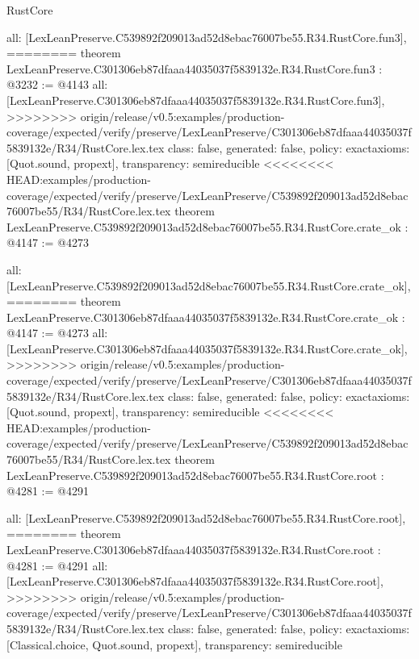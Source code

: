 \begin{lexlean}{RustCore}
\begin{coremodule}
{\begin{coremodule}
{{{{{{  all: [LexLeanPreserve.C539892f209013ad52d8ebac76007be55.R34.RustCore.fun3],
========
theorem LexLeanPreserve.C301306eb87dfaaa44035037f5839132e.R34.RustCore.fun3 : @3232 := @4143 {
  all: [LexLeanPreserve.C301306eb87dfaaa44035037f5839132e.R34.RustCore.fun3],
>>>>>>>> origin/release/v0.5:examples/production-coverage/expected/verify/preserve/LexLeanPreserve/C301306eb87dfaaa44035037f5839132e/R34/RustCore.lex.tex
  class: false,
  generated: false,
  policy: exact{axioms: [Quot.sound, propext]},
  transparency: semireducible
}
<<<<<<<< HEAD:examples/production-coverage/expected/verify/preserve/LexLeanPreserve/C539892f209013ad52d8ebac76007be55/R34/RustCore.lex.tex
theorem LexLeanPreserve.C539892f209013ad52d8ebac76007be55.R34.RustCore.crate_ok : @4147 := @4273 {
  all: [LexLeanPreserve.C539892f209013ad52d8ebac76007be55.R34.RustCore.crate_ok],
========
theorem LexLeanPreserve.C301306eb87dfaaa44035037f5839132e.R34.RustCore.crate_ok : @4147 := @4273 {
  all: [LexLeanPreserve.C301306eb87dfaaa44035037f5839132e.R34.RustCore.crate_ok],
>>>>>>>> origin/release/v0.5:examples/production-coverage/expected/verify/preserve/LexLeanPreserve/C301306eb87dfaaa44035037f5839132e/R34/RustCore.lex.tex
  class: false,
  generated: false,
  policy: exact{axioms: [Quot.sound, propext]},
  transparency: semireducible
}
<<<<<<<< HEAD:examples/production-coverage/expected/verify/preserve/LexLeanPreserve/C539892f209013ad52d8ebac76007be55/R34/RustCore.lex.tex
theorem LexLeanPreserve.C539892f209013ad52d8ebac76007be55.R34.RustCore.root : @4281 := @4291 {
  all: [LexLeanPreserve.C539892f209013ad52d8ebac76007be55.R34.RustCore.root],
========
theorem LexLeanPreserve.C301306eb87dfaaa44035037f5839132e.R34.RustCore.root : @4281 := @4291 {
  all: [LexLeanPreserve.C301306eb87dfaaa44035037f5839132e.R34.RustCore.root],
>>>>>>>> origin/release/v0.5:examples/production-coverage/expected/verify/preserve/LexLeanPreserve/C301306eb87dfaaa44035037f5839132e/R34/RustCore.lex.tex
  class: false,
  generated: false,
  policy: exact{axioms: [Classical.choice, Quot.sound, propext]},
  transparency: semireducible
}

}}}}}}}}
\end{coremodule}}
\end{coremodule}
\end{lexlean}
